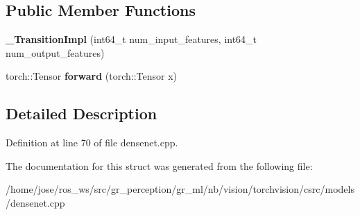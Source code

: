 \subsection*{Public Member Functions}
\begin{DoxyCompactItemize}
\item 
\mbox{\label{structvision_1_1models_1_1__TransitionImpl_a2918f4faba969b1d9218adf3a4b7e35d}} 
{\bfseries \+\_\+\+Transition\+Impl} (int64\+\_\+t num\+\_\+input\+\_\+features, int64\+\_\+t num\+\_\+output\+\_\+features)
\item 
\mbox{\label{structvision_1_1models_1_1__TransitionImpl_aef2707ad2d01751cd93cfc6e430b14b5}} 
torch\+::\+Tensor {\bfseries forward} (torch\+::\+Tensor x)
\end{DoxyCompactItemize}


\subsection{Detailed Description}


Definition at line 70 of file densenet.\+cpp.



The documentation for this struct was generated from the following file\+:\begin{DoxyCompactItemize}
\item 
/home/jose/ros\+\_\+ws/src/gr\+\_\+perception/gr\+\_\+ml/nb/vision/torchvision/csrc/models/densenet.\+cpp\end{DoxyCompactItemize}
